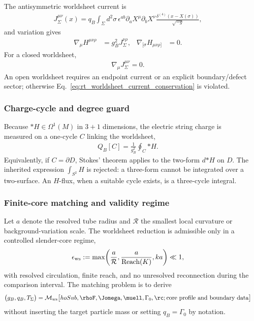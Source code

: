 The antisymmetric worldsheet current is
\begin{align}
    J_\Sigma^{\mu\nu}(x)
    =
    q_B\int_\Sigma d^2\sigma\,
    \epsilon^{ab}
    \partial_aX^\mu\partial_bX^\nu
    \frac{\delta^{(4)}(x-X(\sigma))}{\sqrt{-g}},
    \label{eq:rt_worldsheet_current}
\end{align}
and variation gives
\begin{align}
    \nabla_\mu H^{\mu\nu\rho}
    &=g_B^2J_\Sigma^{\nu\rho},
    &
    \nabla_{[\sigma}H_{\mu\nu\rho]}&=0.
    \label{eq:rt_two_form_field_equations}
\end{align}
For a closed worldsheet,
\begin{align}
    \nabla_\mu J_\Sigma^{\mu\nu}=0.
    \label{eq:rt_worldsheet_current_conservation}
\end{align}
An open worldsheet requires an endpoint current or an explicit boundary/defect
sector; otherwise Eq.~\eqref{eq:rt_worldsheet_current_conservation} is violated.

\subsubsection{Charge-cycle and degree guard}

Because \(*H\in\Omega^1(M)\) in \(3+1\) dimensions, the electric string charge
is measured on a one-cycle \(C\) linking the worldsheet,
\begin{align}
    Q_B[C]
    =
    \frac{1}{g_B^2}\oint_C {*H}.
    \label{eq:rt_two_form_electric_charge}
\end{align}
Equivalently, if \(C=\partial D\), Stokes' theorem applies to the two-form
\(d{*H}\) on \(D\).  The inherited expression \(\int_{S^2}H\) is rejected:
a three-form cannot be integrated over a two-surface.  An \(H\)-flux, when a
suitable cycle exists, is a three-cycle integral.

\subsubsection{Finite-core matching and validity regime}

Let \(a\) denote the resolved tube radius and \(\mathcal R\) the smallest local
curvature or background-variation scale.  The worldsheet reduction is admissible
only in a controlled slender-core regime,
\begin{align}
    \epsilon_{\rm ws}
    :=
    \max\!\left(
        \frac{a}{\mathcal R},
        \frac{a}{\operatorname{Reach}(K)},
        ka
    \right)
    \ll1,
    \label{eq:rt_worldsheet_slenderness_gate}
\end{align}
with resolved circulation, finite reach, and no unresolved reconnection during
the comparison interval.  The matching problem is to derive
\begin{align}
    \bigl(g_B,q_B,T_\Sigma\bigr)
    =
    \mathcal M_{\rm ws}
    \bigl[
hoSub,\rhoF,\Jomega,\muell,\Gamma_0,\rc;
    \text{core profile and boundary data}\bigr]
    \label{eq:rt_worldsheet_matching_map}
\end{align}
without inserting the target particle mass or setting \(q_B=\Gamma_0\) by
notation.

